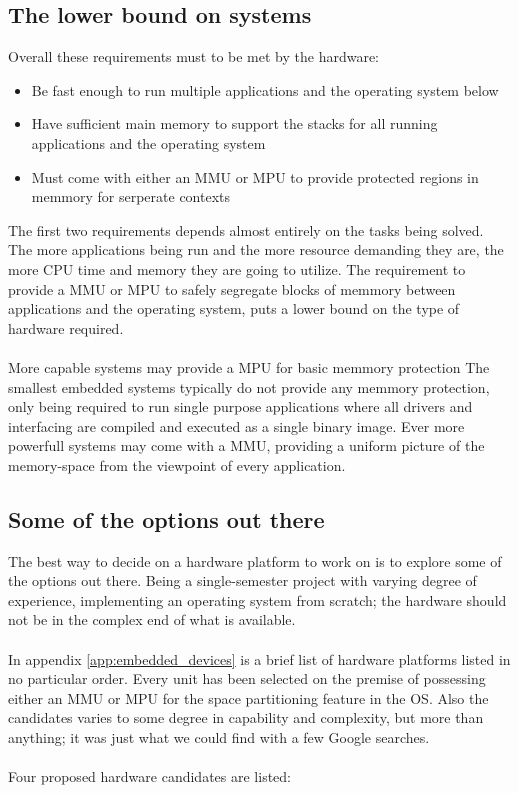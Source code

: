 \subsection{The lower bound on systems}
Overall these requirements must to be met by the hardware:
\begin{itemize}
	\item Be fast enough to run multiple applications and the operating system below
	\item Have sufficient main memory to support the stacks for all running applications and the operating system
	\item Must come with either an MMU or MPU to provide protected regions in memmory for serperate contexts
\end{itemize}
\noindent
The first two requirements depends almost entirely on the tasks being solved.
The more applications being run and the more resource demanding they are,
the more CPU time and memory they are going to utilize.
The requirement to provide a MMU or MPU to safely segregate blocks of memmory between applications and the operating system,
puts a lower bound on the type of hardware required.
\\\\
More capable systems may provide a MPU for basic memmory protection
The smallest embedded systems typically do not provide any memmory protection,
only being required to run single purpose applications where all drivers and interfacing
are compiled and executed as a single binary image.
Ever more powerfull systems may come with a MMU,
providing a uniform picture of the memory-space from the viewpoint of every application.

\subsection{Some of the options out there}
The best way to decide on a hardware platform to work on is to explore some of the options out there.
Being a single-semester project with varying degree of experience,
implementing an operating system from scratch;
the hardware should not be in the complex end of what is available.
\\\\
In appendix \ref{app:embedded_devices} is a brief list of hardware platforms listed in no particular order.
Every unit has been selected on the premise of possessing either an MMU or MPU for the space partitioning feature in the OS.
Also the candidates varies to some degree in capability and complexity,
but more than anything; it was just what we could find with a few Google searches.
\\\\
Four proposed hardware candidates are listed:

